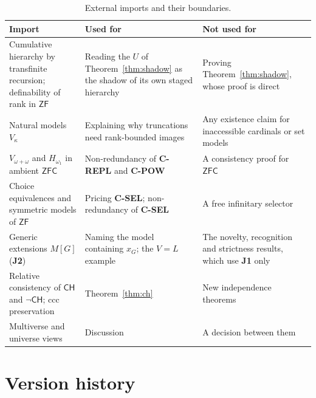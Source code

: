 \documentclass[11pt]{article}
\theoremstyle{definition}
\begin{document}
\begin{table}[htbp]
\centering
\footnotesize
\begin{tabularx}{\textwidth}{@{}>{\raggedright\arraybackslash}p{}>{\raggedright\arraybackslash}p{}>{\raggedright\arraybackslash}X@{}}
\toprule
Import & Used for & Not used for \\
\midrule
Cumulative hierarchy by transfinite recursion; definability of rank in $\mathsf{ZF}$
\citep{Zermelo1930,Jech2003} & Reading the $U$ of Theorem~\ref{thm:shadow} as the shadow of its own staged hierarchy & Proving Theorem~\ref{thm:shadow}, whose proof is direct \\
Natural models $V_\kappa$ \citep{MontagueVaught1959} & Explaining why truncations need rank-bounded images & Any existence claim for inaccessible cardinals or set models \\
$V_{\omega+\omega}$ and $H_{\omega_1}$ in ambient $\mathsf{ZFC}$ \citep{Jech2003,GitmanHamkinsJohnstone2016} & Non-redundancy of \textbf{C-REPL} and \textbf{C-POW} & A consistency proof for $\mathsf{ZFC}$ \\
Choice equivalences and symmetric models of $\mathsf{ZF}$ \citep{Jech1973,Cohen1966} & Pricing \textbf{C-SEL}; non-redundancy of \textbf{C-SEL} & A free infinitary selector \\
Generic extensions $M[G]$ \citep{Cohen1966,Kunen2011} (\textbf{J2}) & Naming the model containing $x_G$; the $V=L$ example & The novelty, recognition and strictness results, which use \textbf{J1} only \\
Relative consistency of $\mathsf{CH}$ and $\neg\mathsf{CH}$; ccc preservation \citep{Godel1938,Godel1940,Cohen1963,Kunen2011} & Theorem~\ref{thm:ch} & New independence theorems \\
Multiverse and universe views \citep{Hamkins2012,Godel1947} & Discussion & A decision between them \\
\bottomrule
\end{tabularx}
\caption{External imports and their boundaries.}
\label{tab:imports-ledger}
\end{table}
 \section{Version history}\label{app:versions}
\end{document}
